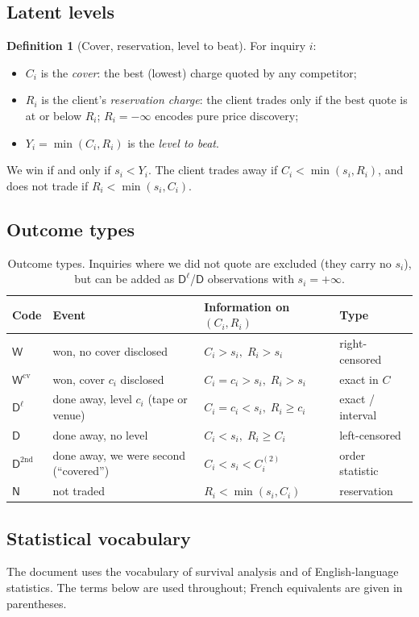 \documentclass[11pt,a4paper]{article}
\theoremstyle{definition}
\newtheorem{definition}{Definition}
\theoremstyle{remark}
\newcommand{\Win}{\mathsf{W}}
\newcommand{\Wc}{\mathsf{W}^{\mathrm{cv}}}
\newcommand{\Dl}{\mathsf{D}^{\ell}}
\newcommand{\Dn}{\mathsf{D}}
\newcommand{\Dcv}{\mathsf{D}^{\mathrm{2nd}}}
\newcommand{\NT}{\mathsf{N}}
\begin{document}
\subsection{Latent levels}
\begin{definition}[Cover, reservation, level to beat]
For inquiry $i$:
\begin{itemize}[itemsep=1pt]
\item $C_i$ is the \emph{cover}: the best (lowest) charge quoted by any competitor;
\item $R_i$ is the client's \emph{reservation charge}: the client trades only if the best quote is at or below $R_i$; $R_i=-\infty$ encodes pure price discovery;
\item $Y_i=\min(C_i,R_i)$ is the \emph{level to beat}.
\end{itemize}
We win if and only if $s_i < Y_i$. The client trades away if $C_i<\min(s_i,R_i)$, and does not trade if $R_i<\min(s_i,C_i)$.
\end{definition}

\subsection{Outcome types}
\begin{table}[H]
\centering
\begin{tabular}{llll}
\toprule
Code & Event & Information on $(C_i,R_i)$ & Type \\
\midrule
$\Win$ & won, no cover disclosed & $C_i>s_i,\;R_i>s_i$ & right-censored \\
$\Wc$ & won, cover $c_i$ disclosed & $C_i=c_i>s_i,\;R_i>s_i$ & exact in $C$ \\
$\Dl$ & done away, level $c_i$ (tape or venue) & $C_i=c_i<s_i,\;R_i\ge c_i$ & exact / interval \\
$\Dn$ & done away, no level & $C_i<s_i,\;R_i\ge C_i$ & left-censored \\
$\Dcv$ & done away, we were second (``covered'') & $C_i<s_i<C^{(2)}_i$ & order statistic \\
$\NT$ & not traded & $R_i<\min(s_i,C_i)$ & reservation \\
\bottomrule
\end{tabular}
\caption{Outcome types. Inquiries where we did not quote are excluded (they carry no $s_i$), but can be added as $\Dl$/$\Dn$ observations with $s_i=+\infty$.}
\label{tab:outcomes}
\end{table}

\subsection{Statistical vocabulary}\label{sec:vocab}
The document uses the vocabulary of survival analysis and of English-language statistics. The terms below are used throughout; French equivalents are given in parentheses.
\end{document}
